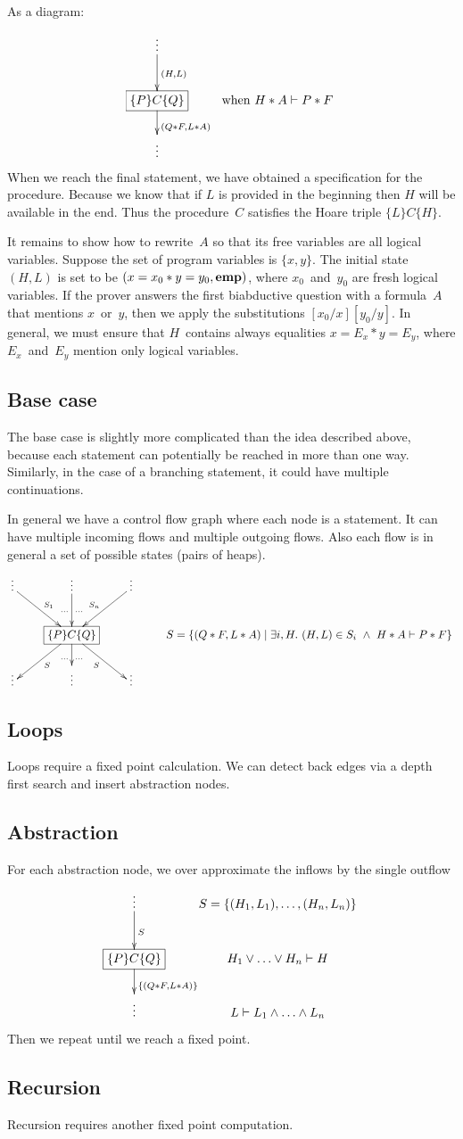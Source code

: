 \documentclass{article}
\newcommand{\hoare}[3]{\{#1\}#2\{#3\}}
\newcommand{\set}[2]{\{#1 \mid #2\}}
\newcommand{\ts}{\vdash} %
\begin{document}
As a diagram:
\[
\xymatrix{
{\vdots} \ar[d]^{(H, L)} \\
*+[F]{\hoare P C Q} \ar[d]^{(Q * F, L * A)} &
{\mathrm{when}\ H * A \ts P * F} \\
{\vdots}
}
\]
When we reach the final statement, we have obtained a specification
for the procedure. Because we know that if $L$ is provided in the
beginning then $H$ will be available in the end. Thus the procedure~$C$
satisfies the Hoare triple $\hoare L C H$.

\smallskip
It remains to show how to rewrite~$A$ so that its free variables
are all logical variables.  Suppose the set of program variables
is $\{x,y\}$.  The initial state $(H,L)$ is set to be
$(x=x_0*y=y_0,{\bf emp})$, where $x_0$~and~$y_0$ are fresh
logical variables.  If the prover answers the first biabductive
question with a formula~$A$ that mentions $x$~or~$y$, then we
apply the substitutions $[x_0/x][y_0/y]$.  In general, we must
ensure that $H$~contains always equalities $x=E_x*y=E_y$, where
$E_x$~and~$E_y$ mention only logical variables.

\subsection{Base case}\label{sec:symbexe:base}
The base case is slightly more complicated than the idea described
above, because each statement can potentially be reached in more than
one way. Similarly, in the case of a branching statement, it could
have multiple continuations.

In general we have a control flow graph where each node is a
statement. It can have multiple incoming flows and multiple outgoing
flows. Also each flow is in general a set of possible states (pairs of
heaps).
\[
\xymatrix{
{\vdots} \ar[dr]^{S_1} & {\vdots} \ar[d]_{\ldots}^{\ldots} & {\vdots} \ar[dl]_{S_n} \\
& *+[F]{\hoare P C Q} \ar[dl]^{S} \ar[d]_{\ldots}^{\ldots} \ar[dr]_{S}
& & S = \set{(Q * F, L * A)}{\exists i, H.\ (H, L)\in S_i\ \land\ H * A \ts P * F} \\
{\vdots} & {\vdots} & {\vdots}
}
\]

\subsection{Loops}\label{sec:symbexe:loops}
Loops require a fixed point calculation. We can detect back edges via
a depth first search and insert abstraction nodes.

\subsection{Abstraction}\label{sec:symbexe:abstraction}
For each abstraction node, we over approximate the inflows by the single outflow
\[
\xymatrix{
{\vdots} \ar[d]^{S} & {S = \{(H_1, L_1), \ldots, (H_n, L_n)\}}\\
*+[F]{\hoare P C Q} \ar[d]^{\{(Q * F, L * A)\}} & H_1 \lor \ldots \lor H_n \ts H \\
{\vdots} & L \ts L_1 \land \ldots \land L_n
}
\]
Then we repeat until we reach a fixed point.
\subsection{Recursion}\label{sec:symbexe:recursion}
Recursion requires another fixed point computation.
\end{document}
